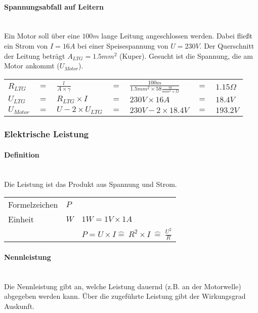 		\paragraph{Spannungsabfall auf Leitern}~\\
		
\noindent Ein Motor soll über eine $100m$ lange Leitung angeschlossen werden. Dabei fließt ein Strom von $I = 16A$ bei einer Speisespannung von $U = 230V$. Der Querschnitt der Leitung beträgt $A_{LTG} = 1.5mm^2$ (Kuper). Gesucht ist die Spannung, die am Motor ankommt ($U_{Motor}$).\\

\begin{tabular}{lllllll}
$R_{LTG}$ & $=$ & $\frac{l}{A\times\gamma}$ & $=$ & $\frac{100m}{1.5mm^2\times 58\frac{m}{mm^2\times\Omega}}$ & $=$ & $1.15\Omega$\\
$U_{LTG}$ & $=$ & $R_{LTG}\times I$ & $=$ & $230V \times 16A$ & $=$ & $18.4V$\\
$U_{Motor}$ & $=$ & $U - 2\times U_{LTG}$ & $=$ & $230V - 2\times 18.4V$ & $=$ & $193.2V$ \\
\end{tabular}

\subsubsection{Elektrische Leistung}

\paragraph{Definition}~\\
Die Leistung ist das Produkt aus Spannung und Strom.\\
\begin{tabular}{lll}
Formelzeichen & $P$ &\\
Einheit & $W$ & $1W = 1V\times 1A$\\
& & $P = U\times I \widehat{=}\ R^2\times I\ \widehat{=}\ \frac{U^2}{R}$\\
\end{tabular}

\paragraph{Nennleistung}~\\
Die Nennleistung gibt an, welche Leistung dauernd (z.B. an der Motorwelle) abgegeben werden kann. Über die zugeführte Leistung gibt der Wirkungsgrad Auskunft.

